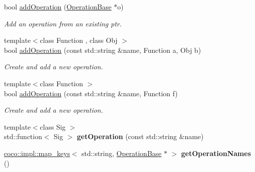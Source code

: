 \begin{DoxyCompactItemize}
\item 
\hypertarget{classcoco_1_1_service_ae0781be1829827b69d055fa89c8625c6}{}bool \hyperlink{classcoco_1_1_service_ae0781be1829827b69d055fa89c8625c6}{add\+Operation} (\hyperlink{classcoco_1_1_operation_base}{Operation\+Base} $\ast$o)\label{classcoco_1_1_service_ae0781be1829827b69d055fa89c8625c6}

\begin{DoxyCompactList}\small\item\em Add an operation from an existing ptr. \end{DoxyCompactList}\item 
\hypertarget{classcoco_1_1_service_a3ce8fa79ff5c68593d6a8229a95d396d}{}{\footnotesize template$<$class Function , class Obj $>$ }\\bool \hyperlink{classcoco_1_1_service_a3ce8fa79ff5c68593d6a8229a95d396d}{add\+Operation} (const std\+::string \&name, Function a, Obj b)\label{classcoco_1_1_service_a3ce8fa79ff5c68593d6a8229a95d396d}

\begin{DoxyCompactList}\small\item\em Create and add a new operation. \end{DoxyCompactList}\item 
\hypertarget{classcoco_1_1_service_a22606de3c858aae68d100c253cfc6c49}{}{\footnotesize template$<$class Function $>$ }\\bool \hyperlink{classcoco_1_1_service_a22606de3c858aae68d100c253cfc6c49}{add\+Operation} (const std\+::string \&name, Function f)\label{classcoco_1_1_service_a22606de3c858aae68d100c253cfc6c49}

\begin{DoxyCompactList}\small\item\em Create and add a new operation. \end{DoxyCompactList}\item 
\hypertarget{classcoco_1_1_service_a2649fc0bfef1e23b57d29bdf0a15e2d9}{}{\footnotesize template$<$class Sig $>$ }\\std\+::function$<$ Sig $>$ {\bfseries get\+Operation} (const std\+::string \&name)\label{classcoco_1_1_service_a2649fc0bfef1e23b57d29bdf0a15e2d9}

\item 
\hypertarget{classcoco_1_1_service_af6a8a7bfb1d4330ad0c3f22aa592a7d8}{}\hyperlink{structcoco_1_1impl_1_1map__keys}{coco\+::impl\+::map\+\_\+keys}$<$ std\+::string, \hyperlink{classcoco_1_1_operation_base}{Operation\+Base} $\ast$ $>$ {\bfseries get\+Operation\+Names} ()\label{classcoco_1_1_service_af6a8a7bfb1d4330ad0c3f22aa592a7d8}


\end{DoxyCompactItemize}

